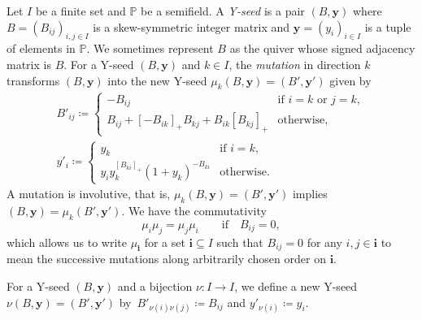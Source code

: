\documentclass[10pt,a4paper]{amsart}
\numberwithin{equation}{section}
\theoremstyle{definition}
\newcommand*{\maxzero}[1]{[#1]_{+}}
\begin{document}
Let $I$ be a finite set and $\mathbb{P}$ be a semifield.
A \emph{Y-seed} is a pair $(B, \boldsymbol{y})$ where $B = (B_{ij})_{i,j \in I}$ is a skew-symmetric integer matrix and
$\boldsymbol{y} = (y_i)_{i \in I}$ is a tuple of elements in $\mathbb{P}$.
We sometimes represent $B$ as the quiver whose signed adjacency matrix is $B$.
For a Y-seed $(B, \boldsymbol{y})$ and $k \in I$, the \emph{mutation} in direction $k$ transforms $(B, \boldsymbol{y})$ into the
new Y-seed $\mu_k(B, \boldsymbol{y}) = (B', \boldsymbol{y}')$ given by
\begin{gather*}
 B'_{ij} \coloneqq
 \begin{cases}
 -B_{ij} & \text{if $i=k$ or $j=k$}, \\
 B_{ij} +
 \maxzero{- B_{ik}} B_{kj} +
 B_{ik} \maxzero{ B_{kj}} & \text{otherwise},
 \end{cases} \\
 y'_i \coloneqq
 \begin{cases}
 y_k & \text{if $i=k$}, \\
 y_i y_k^{\maxzero{B_{ki}}} (1 + y_k)^{-B_{ki}}
 & \text{otherwise}.
 \end{cases}
\end{gather*}
A mutation is involutive, that is, $\mu_k (B, \boldsymbol{y}) = (B', \boldsymbol{y}')$ implies
$(B, \boldsymbol{y}) = \mu_k (B', \boldsymbol{y}')$.
We have the commutativity
\begin{equation}\label{eq:mutation comm}
 \mu_i \mu_j = \mu_j \mu_i \qquad \text{if}\quad B_{ij} = 0,
\end{equation}
which allows us to write $\mu_{\boldsymbol{i}}$ for a set $\boldsymbol{i} \subseteq I$
such that $B_{ij} = 0$ for any $i,j \in \boldsymbol{i}$
to mean the successive mutations along arbitrarily chosen order on $\boldsymbol{i}$.

For a Y-seed $(B, \boldsymbol{y})$ and a bijection $\nu \colon I \to I$, we define a new Y-seed
$\nu(B, \boldsymbol{y}) = (B', \boldsymbol{y}')$ by~${B'_{\nu(i)\nu(j)} \coloneqq B_{ij}}$ and $y'_{\nu(i)} \coloneqq y_i$.
\end{document}
